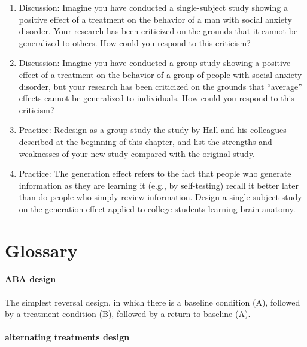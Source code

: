 \documentclass[
]{krantz}
\providecommand{\tightlist}{%
  \setlength{\itemsep}{0pt}\setlength{\parskip}{0pt}}
\begin{document}
\begin{enumerate}
\def\labelenumi{\arabic{enumi}.}
\tightlist
\item
  Discussion: Imagine you have conducted a single-subject study showing a positive effect of a treatment on the behavior of a man with social anxiety disorder. Your research has been criticized on the grounds that it cannot be generalized to others. How could you respond to this criticism?
\item
  Discussion: Imagine you have conducted a group study showing a positive effect of a treatment on the behavior of a group of people with social anxiety disorder, but your research has been criticized on the grounds that ``average'' effects cannot be generalized to individuals. How could you respond to this criticism?
\item
  Practice: Redesign as a group study the study by Hall and his colleagues described at the beginning of this chapter, and list the strengths and weaknesses of your new study compared with the original study.
\item
  Practice: The generation effect refers to the fact that people who generate information as they are learning it (e.g., by self-testing) recall it better later than do people who simply review information. Design a single-subject study on the generation effect applied to college students learning brain anatomy.
\end{enumerate}

\hypertarget{glossary-9}{%
\section{Glossary}\label{glossary-9}}

\hypertarget{aba-design}{%
\paragraph*{ABA design}\label{aba-design}}

The simplest reversal design, in which there is a baseline condition (A), followed by a treatment condition (B), followed by a return to baseline (A).

\hypertarget{alternating-treatments-design}{%
\paragraph*{alternating treatments design}\label{alternating-treatments-design}}
\end{document}
